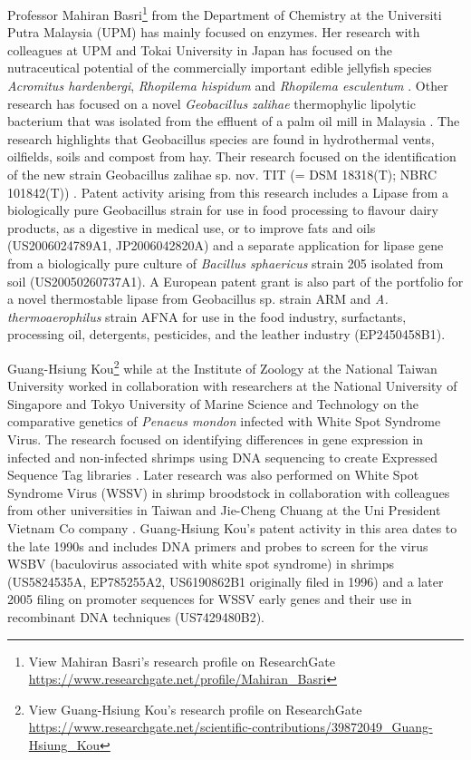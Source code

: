 \documentclass[openany]{book}
\let\rmarkdownfootnote\footnote%
\def\footnote{\protect\rmarkdownfootnote}
\theoremstyle{definition}
\theoremstyle{definition}
\theoremstyle{definition}
\theoremstyle{remark}
\begin{document}
Professor Mahiran Basri\footnote{View Mahiran Basri's research profile
  on ResearchGate
  \url{https://www.researchgate.net/profile/Mahiran_Basri}} from the
Department of Chemistry at the Universiti Putra Malaysia (UPM) has
mainly focused on enzymes. Her research with colleagues at UPM and Tokai
University in Japan has focused on the nutraceutical potential of the
commercially important edible jellyfish species \emph{Acromitus
hardenbergi}, \emph{Rhopilema hispidum} and \emph{Rhopilema esculentum}
\citep{Khong_2016}. Other research has focused on a novel
\emph{Geobacillus zalihae} thermophylic lipolytic bacterium that was
isolated from the effluent of a palm oil mill in Malaysia
\citep{Rahman_2007}. The research highlights that Geobacillus species
are found in hydrothermal vents, oilfields, soils and compost from hay.
Their research focused on the identification of the new strain
Geobacillus zalihae sp. nov. TIT (= DSM 18318(T); NBRC 101842(T))
\citep{Khong_2016}. Patent activity arising from this research includes
a Lipase from a biologically pure Geobacillus strain for use in food
processing to flavour dairy products, as a digestive in medical use, or
to improve fats and oils (US2006024789A1, JP2006042820A) and a separate
application for lipase gene from a biologically pure culture of
\emph{Bacillus sphaericus} strain 205 isolated from soil
(US20050260737A1). A European patent grant is also part of the portfolio
for a novel thermostable lipase from Geobacillus sp. strain ARM and
\emph{A. thermoaerophilus} strain AFNA for use in the food industry,
surfactants, processing oil, detergents, pesticides, and the leather
industry (EP2450458B1).

Guang-Hsiung Kou\footnote{View Guang-Hsiung Kou's research profile on
  ResearchGate
  \url{https://www.researchgate.net/scientific-contributions/39872049_Guang-Hsiung_Kou}}
while at the Institute of Zoology at the National Taiwan University
worked in collaboration with researchers at the National University of
Singapore and Tokyo University of Marine Science and Technology on the
comparative genetics of \emph{Penaeus mondon} infected with White Spot
Syndrome Virus. The research focused on identifying differences in gene
expression in infected and non-infected shrimps using DNA sequencing to
create Expressed Sequence Tag libraries \citep{Leu_2007}. Later research
was also performed on White Spot Syndrome Virus (WSSV) in shrimp
broodstock in collaboration with colleagues from other universities in
Taiwan and Jie-Cheng Chuang at the Uni President Vietnam Co company
\citep{Chang_2012}. Guang-Hsiung Kou's patent activity in this area
dates to the late 1990s and includes DNA primers and probes to screen
for the virus WSBV (baculovirus associated with white spot syndrome) in
shrimps (US5824535A, EP785255A2, US6190862B1 originally filed in 1996)
and a later 2005 filing on promoter sequences for WSSV early genes and
their use in recombinant DNA techniques (US7429480B2).
\end{document}
